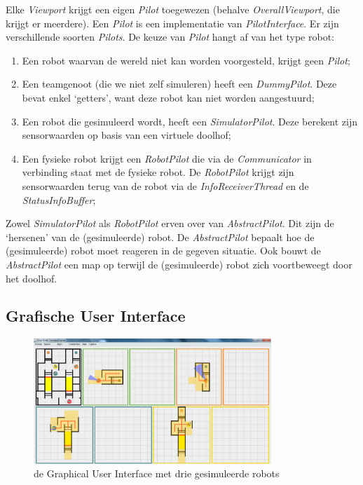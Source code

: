 \documentclass[eind]{penoverslag}
\begin{document}
Elke \textit{Viewport} krijgt een eigen \textit{Pilot} toegewezen (behalve \textit{OverallViewport}, die krijgt er meerdere). Een \textit{Pilot} is een implementatie van \textit{PilotInterface}. Er zijn verschillende soorten \textit{Pilots}. De keuze van \textit{Pilot} hangt af van het type robot:
\begin{enumerate}
	\item Een robot waarvan de wereld niet kan worden voorgesteld, krijgt geen \textit{Pilot};
	\item Een teamgenoot (die we niet zelf simuleren) heeft een \textit{DummyPilot}. Deze bevat enkel `getters', want deze robot kan niet worden aangestuurd;
	\item Een robot die gesimuleerd wordt, heeft een \textit{SimulatorPilot}. Deze berekent zijn sensorwaarden op basis van een virtuele doolhof;
	\item Een fysieke robot krijgt een \textit{RobotPilot} die via de \textit{Communicator} in verbinding staat met de fysieke robot. De \textit{RobotPilot} krijgt zijn sensorwaarden terug van de robot via de \textit{InfoReceiverThread} en de \textit{StatusInfoBuffer};
\end{enumerate}

Zowel \textit{SimulatorPilot} als \textit{RobotPilot} erven over van \textit{AbstractPilot}. Dit zijn de `hersenen' van de (gesimuleerde) robot. De \textit{AbstractPilot} bepaalt hoe de (gesimuleerde) robot moet reageren in de gegeven situatie. Ook bouwt de \textit{AbstractPilot} een map op terwijl de (gesimuleerde) robot zich voortbeweegt door het doolhof.

\subsection{Grafische User Interface}
\label{ssec:GUI}

\begin{figure}[h]
\centering
	\includegraphics[width=0.8\textwidth]{gui}
\caption{de Graphical User Interface met drie gesimuleerde robots}
\label{fig:GUI1}
\end{figure}
\end{document}
